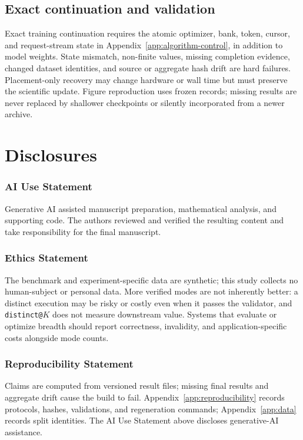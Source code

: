 \documentclass{article}
\newcommand{\1}{\mathbf 1}
\theoremstyle{remark}
\theoremstyle{definition}
\theoremstyle{plain}
\begin{document}
\subsection{Exact continuation and validation}
\label{app:repro-recovery}

Exact training continuation requires the atomic optimizer, bank, token,
cursor, and request-stream state in Appendix~\ref{app:algorithm-control},
in addition to model weights. State mismatch, non-finite values, missing
completion evidence, changed dataset identities, and source or aggregate
hash drift are hard failures. Placement-only recovery may change hardware
or wall time but must preserve the scientific update. Figure reproduction
uses frozen records; missing results are never replaced by shallower
checkpoints or silently incorporated from a newer archive.

\section{Disclosures}
\label{app:disclosures}

\subsubsection*{AI Use Statement}
\label{sec:ai-use}

Generative AI assisted manuscript preparation, mathematical analysis, and
supporting code. The authors reviewed and verified the resulting content and
take responsibility for the final manuscript.

\subsubsection*{Ethics Statement}

The benchmark and experiment-specific data are synthetic; this study collects
no human-subject or personal data. More verified modes are not inherently
better: a distinct execution may be risky or costly even when it passes the
validator, and \texttt{distinct@}$K$ does not measure downstream value. Systems
that evaluate or optimize breadth should report correctness, invalidity, and
application-specific costs alongside mode counts.

\subsubsection*{Reproducibility Statement}

Claims are computed from versioned result files; missing final results and aggregate drift cause the build to
fail. Appendix~\ref{app:reproducibility} records protocols, hashes, validations,
and regeneration commands; Appendix~\ref{app:data} records split identities.
The AI Use Statement above discloses generative-AI assistance.
\end{document}
